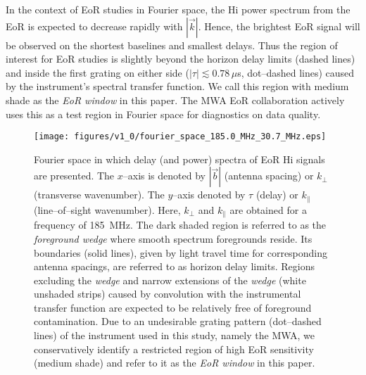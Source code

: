 \documentclass[preprint2,iop,numberedappendix]{emulateapj}
\begin{document}

In the context of EoR studies in Fourier space, the H{\sc i} power spectrum from the EoR is expected to decrease rapidly with $|\vec{k}|$. Hence, the brightest EoR signal will be observed on the shortest baselines and smallest delays. Thus the region of interest for EoR studies is slightly beyond the horizon delay limits (dashed lines) and inside the first grating on either side ($|\tau| \lesssim 0.78\,\mu$s, dot--dashed lines) caused by the instrument's spectral transfer function. We call this region with medium shade as the {\it EoR window} in this paper. The MWA EoR collaboration actively uses this as a test region in Fourier space for diagnostics on data quality.

\begin{figure}[htb]
\centering
\texttt{[image: figures/v1\_0/fourier\_space\_185.0\_MHz\_30.7\_MHz.eps]}
\caption{Fourier space in which delay (and power) spectra of EoR H{\sc i} signals are presented. The $x$--axis is denoted by $|\vec{b}|$ (antenna spacing) or $k_\perp$ (transverse wavenumber). The $y$--axis denoted by $\tau$ (delay) or $k_\parallel$ (line--of--sight wavenumber). Here, $k_\perp$ and $k_\parallel$ are obtained for a frequency of 185~MHz. The dark shaded region is referred to as the {\it foreground wedge} where smooth spectrum foregrounds reside. Its boundaries (solid lines), given by light travel time for corresponding antenna spacings, are referred to as horizon delay limits. Regions excluding the {\it wedge} and narrow extensions of the {\it wedge} (white unshaded strips) caused by convolution with the instrumental transfer function are expected to be relatively free of foreground contamination. Due to an undesirable grating pattern (dot--dashed lines) of the instrument used in this study, namely the MWA, we conservatively identify a restricted region of high EoR sensitivity (medium shade) and refer to it as the {\it EoR window} in this paper. \label{fig:fourier-space}}
\end{figure}

\end{document}
